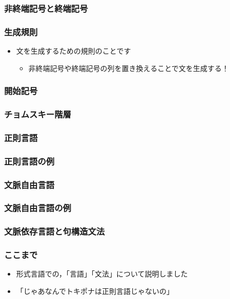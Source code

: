 \documentclass[14pt]{beamer}
\theoremstyle{definition}
\begin{document}
\begin{frame}
	\frametitle{非終端記号と終端記号}
\end{frame}


\begin{frame}
	\frametitle{生成規則}

	\begin{itemize}
		\item 文を生成するための規則のことです
			\begin{itemize}
				\item 非終端記号や終端記号の列を置き換えることで文を生成する！
			\end{itemize}
	\end{itemize}
\end{frame}


\begin{frame}
	\frametitle{開始記号}
\end{frame}


\begin{frame}
	\frametitle{チョムスキー階層}
\end{frame}


\begin{frame}
	\frametitle{正則言語}
\end{frame}


\begin{frame}
	\frametitle{正則言語の例}
\end{frame}


\begin{frame}
	\frametitle{文脈自由言語}
\end{frame}


\begin{frame}
	\frametitle{文脈自由言語の例}
\end{frame}


\begin{frame}
	\frametitle{文脈依存言語と句構造文法}
\end{frame}


\begin{frame}
	\frametitle{ここまで}

	\begin{itemize}
		\item 形式言語での，「言語」「文法」について説明しました
		\item 「じゃあなんでトキポナは正則言語じゃないの」
	\end{itemize}
\end{frame}
\end{document}

